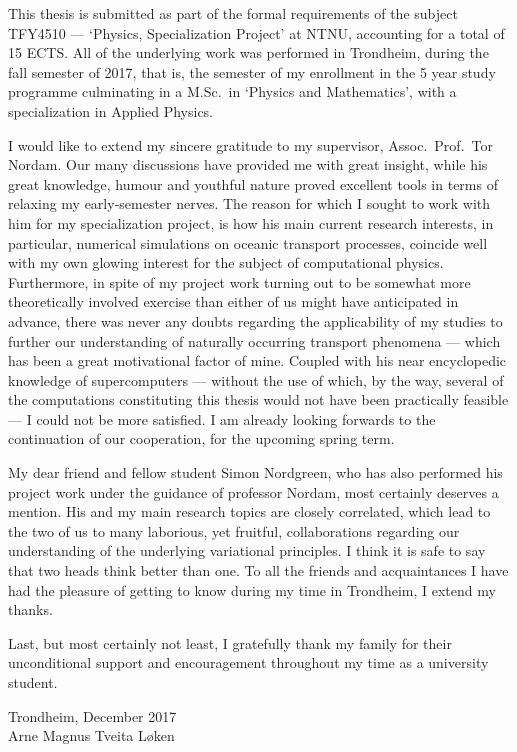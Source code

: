 This thesis is submitted as part of the formal requirements of the subject
TFY4510 --- `Physics, Specialization Project' at NTNU, accounting for a total
of 15 ECTS. All of the underlying work was performed in Trondheim, during the
fall semester of 2017, that is, the  semester of my enrollment in the
5 year study programme culminating in a M.Sc.\ in `Physics and Mathematics',
with a specialization in Applied Physics.

I would like to extend my sincere gratitude to my supervisor, Assoc.\ Prof.\
Tor Nordam. Our many discussions have provided me with great insight, while
his great knowledge, humour and youthful nature proved excellent tools in terms
of relaxing my early-semester nerves. The reason for which I sought to work with
him for my specialization project, is how his main current research interests,
in particular, numerical simulations on oceanic transport processes, coincide
well with my own glowing interest for the subject of computational physics.
Furthermore, in spite of my project work turning out to be somewhat more
theoretically involved exercise than either of us might have anticipated in
advance, there was never any doubts regarding the applicability of my studies to
further our understanding of naturally occurring transport phenomena --- which
has been a great motivational factor of mine. Coupled with his near
encyclopedic knowledge of supercomputers --- without the use of which, by the
way, several of the computations constituting this thesis would not have been
practically feasible --- I could not be more satisfied. I am already looking
forwards to the continuation of our cooperation, for the upcoming spring term.

My dear friend and fellow student Simon Nordgreen, who has also performed his
project work under the guidance of professor Nordam, most certainly deserves a
mention. His and my main research topics are closely correlated, which lead
to the two of us to many laborious, yet fruitful, collaborations regarding
our understanding of the underlying variational principles. I think it is safe
to say that two heads think better than one. To all the friends and
acquaintances I have had the pleasure of getting to know during my
time in Trondheim, I extend my thanks.

Last, but most certainly not least, I gratefully thank my family for their
unconditional support and encouragement throughout my time as a university
student.


\begin{minipage}[t]{\textwidth}
    \begin{flushright}
    Trondheim, December 2017\\
    Arne Magnus Tveita Løken
    \end{flushright}
\end{minipage}\\[2cm]


